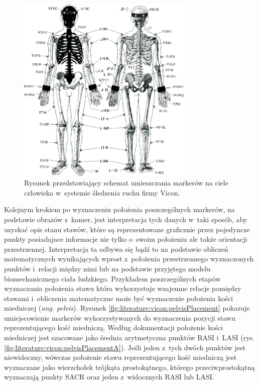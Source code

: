 \begin{figure}[!htp]
	\centering	
	\includegraphics[width=0.75\textwidth]{images/markerPlacement.jpg}
	\caption{Rysunek przedstawiający schemat umieszczania markerów na ciele człowieka w~systemie śledzenia ruchu firmy Vicon\cite{ViconGaitPlacement}.}
	\label{fig:literature:vicon:markerPlacement}
\end{figure}
		
Kolejnym krokiem po wyznaczeniu położenia poszczególnych markerów, na podstawie obrazów z~kamer, jest interpretacja tych danych w~taki sposób, aby uzyskać opis stanu stawów, które są reprezentowane graficznie przez pojedyncze punkty posiadajace informacje nie tylko o~swoim położeniu ale także orientacji przestrzennej. Interpretacja ta odbywa się bądź to na podstawie obliczeń matematycznych wynikających wprost z~położenia przestrzennego wyznaczonych punktów i~relacji między nimi lub na podstawie przyjętego modelu biomechanicznego ciała ludzkiego. 
Przykładem poszczególnych etapów wyznaczania położenia stawu która wykorzystuje wzajemne relacje pomiędzy stawami i~obliczenia matematyczne może być wyznaczenie położenia kości miedniczej (\emph{ang. pelvis}). Rysunek \ref{fig:literature:vicon:pelvisPlacement} pokazuje umiejscowienie markerów wykorzystywanych do wyznaczenia pozycji stawu reprezentującego kość miedniczą. Według dokumentacji \cite{ViconModelingInstruction} położenie kości miedniczej jest szacowane jako średnia arytmetyczna punktów RASI i~LASI (rys. \ref{fig:literature:vicon:pelvisPlacementA}). Jeśli jeden z~tych dwóch punktów jest niewidoczny, wówczas położenie stawu reprezentującego kość miedniczą jest wyznaczane jako wierzchołek trójkąta prostokątnego, którego przeciwprostokątną wyznaczają punkty SACR oraz jeden z~widocznych RASI lub LASI.
		
